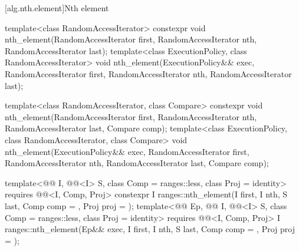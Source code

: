 [alg.nth.element]{Nth element}

%
\begin{itemdecl}
template<class RandomAccessIterator>
  constexpr void nth_element(RandomAccessIterator first, RandomAccessIterator nth,
                             RandomAccessIterator last);
template<class ExecutionPolicy, class RandomAccessIterator>
  void nth_element(ExecutionPolicy&& exec,
                   RandomAccessIterator first, RandomAccessIterator nth,
                   RandomAccessIterator last);

template<class RandomAccessIterator, class Compare>
  constexpr void nth_element(RandomAccessIterator first, RandomAccessIterator nth,
                             RandomAccessIterator last,  Compare comp);
template<class ExecutionPolicy, class RandomAccessIterator, class Compare>
  void nth_element(ExecutionPolicy&& exec,
                   RandomAccessIterator first, RandomAccessIterator nth,
                   RandomAccessIterator last, Compare comp);

template<@@ I, @@<I> S, class Comp = ranges::less,
         class Proj = identity>
  requires @@<I, Comp, Proj>
  constexpr I
    ranges::nth_element(I first, I nth, S last, Comp comp = {}, Proj proj = {});
template<@@ Ep, @@ I, @@<I> S,
         class Comp = ranges::less, class Proj = identity>
  requires @@<I, Comp, Proj>
  I ranges::nth_element(Ep&& exec, I first, I nth, S last, Comp comp = {}, Proj proj = {});
\end{itemdecl}

